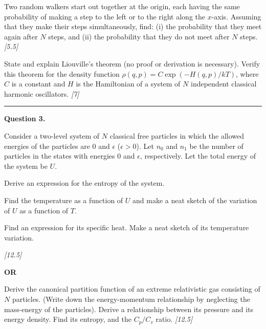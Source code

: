\documentclass[11pt,a4paper]{article}
\newcommand{\pts}[1]{\hfill   \textit{[#1]}}
\begin{document}
\begin{parts}
  \item Two random walkers start out together at the origin, each having the same probability of making a step to the left or to the right along the $x$-axis. Assuming that they make their steps simultaneously, find: (i) the probability that they meet again after $N$ steps, and (ii) the probability that they do not meet after $N$ steps. \pts{5.5}
  \item State and explain Liouville’s theorem (no proof or derivation is necessary). Verify this theorem for the density function $\rho(q, p) = C \exp(-H(q, p)/kT)$, where $C$ is a constant and $H$ is the Hamiltonian of a system of $N$ independent classical harmonic oscillators. \pts{7}
\end{parts}

\medskip\rule{\linewidth}{0.2pt}




\noindent   \textbf{Question 3.}

\begin{parts}
  \item Consider a two-level system of $N$ classical free particles in which the allowed energies of the particles are $0$ and $\epsilon$ ($\epsilon > 0$). Let $n_0$ and $n_1$ be the number of particles in the states with energies $0$ and $\epsilon$, respectively. Let the total energy of the system be $U$.
    
\begin{parts}
      \item Derive an expression for the entropy of the system.
      \item Find the temperature as a function of $U$ and make a neat sketch of the variation of $U$ as a function of $T$.
      \item Find an expression for its specific heat. Make a neat sketch of its temperature variation.
    \end{parts} \pts{12.5}
\end{parts}
\hfill   \textbf{OR}

\begin{parts}
  \item Derive the canonical partition function of an extreme relativistic gas consisting of $N$ particles. (Write down the energy-momentum relationship by neglecting the mass-energy of the particles). Derive a relationship between its pressure and its energy density. Find its entropy, and the $C_p/C_v$ ratio. \pts{12.5}
\end{parts}
\end{document}
